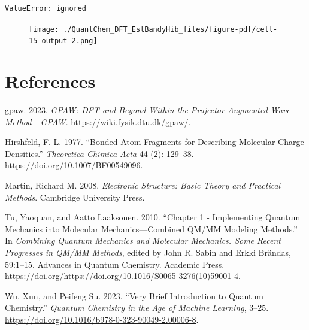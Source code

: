\documentclass[
  letterpaper,
  DIV=11,
  numbers=noendperiod]{scrreprt}
\newlength{\cslhangindent}
\newlength{\cslentryspacingunit} %
\newenvironment{CSLReferences}[2] %
 {%
  \setlength{\parindent}{0pt}
  \ifodd #1
  \let\oldpar\par
  \def\par{\hangindent=\cslhangindent\oldpar}
  \fi
  \setlength{\parskip}{#2\cslentryspacingunit}
 }%
 {}
\begin{document}
\begin{verbatim}
ValueError: ignored
\end{verbatim}

\begin{figure}[H]

{\centering \texttt{[image: ./QuantChem\_DFT\_EstBandyHib\_files/figure-pdf/cell-15-output-2.png]}

}

\end{figure}


\hypertarget{references}{%
\chapter*{References}\label{references}}

\hypertarget{refs}{}
\begin{CSLReferences}{1}{0}
\leavevmode{}%
gpaw. 2023. \emph{GPAW: DFT and Beyond Within the Projector-Augmented
Wave Method - GPAW}. \url{https://wiki.fysik.dtu.dk/gpaw/}.

\leavevmode{}%
Hirshfeld, F. L. 1977. {``Bonded-Atom Fragments for Describing Molecular
Charge Densities.''} \emph{Theoretica Chimica Acta} 44 (2): 129--38.
\url{https://doi.org/10.1007/BF00549096}.

\leavevmode{}%
Martin, Richard M. 2008. \emph{Electronic Structure: Basic Theory and
Practical Methods}. Cambridge University Press.

\leavevmode{}%
Tu, Yaoquan, and Aatto Laaksonen. 2010. {``Chapter 1 - Implementing
Quantum Mechanics into Molecular Mechanics---Combined QM/MM Modeling
Methods.''} In \emph{Combining Quantum Mechanics and Molecular
Mechanics. Some Recent Progresses in QM/MM Methods}, edited by John R.
Sabin and Erkki Brändas, 59:1--15. Advances in Quantum Chemistry.
Academic Press.
https://doi.org/\url{https://doi.org/10.1016/S0065-3276(10)59001-4}.

\leavevmode{}%
Wu, Xun, and Peifeng Su. 2023. {``Very Brief Introduction to Quantum
Chemistry.''} \emph{Quantum Chemistry in the Age of Machine Learning},
3--25. \url{https://doi.org/10.1016/b978-0-323-90049-2.00006-8}.

\end{CSLReferences}
\end{document}

